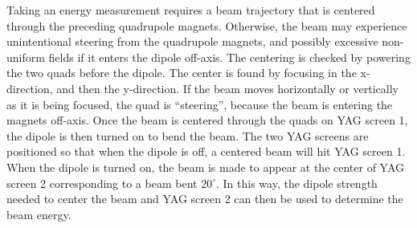 Taking an energy measurement requires a beam trajectory
that is centered through the preceding quadrupole magnets. Otherwise, the beam 
may experience unintentional steering from the quadrupole magnets, and possibly excessive non-uniform fields 
if it enters the dipole off-axis. The centering is checked by powering the two 
quads before the dipole. The center is found by focusing 
in the x-direction, and then the y-direction. If the beam 
moves horizontally or vertically as it is being focused, 
the quad is ``steering'', because the beam is entering the magnets off-axis.
Once the beam is centered through the quads on YAG screen 1, 
the dipole is then turned on to bend the beam.
The two YAG screens are positioned so that when the dipole is off, 
a centered beam will hit YAG screen 1. When the dipole is turned
on, the beam is made to appear at the center of YAG screen 2 corresponding to a 
beam bent $20^\circ$. In this way, the dipole strength needed to center the beam and YAG screen 2 can 
then be used to determine the beam energy.

